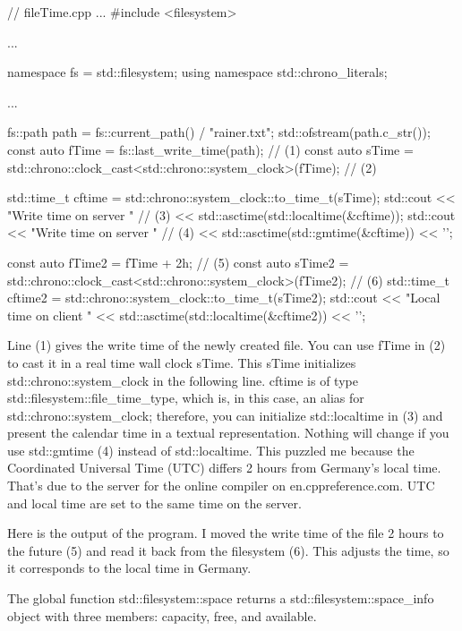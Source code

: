 
\begin{cpp}
// fileTime.cpp
...
#include <filesystem>

...

namespace fs = std::filesystem;
using namespace std::chrono_literals;

...

fs::path path = fs::current_path() / "rainer.txt";
std::ofstream(path.c_str());
const auto fTime = fs::last_write_time(path); // (1)
const auto sTime = std::chrono::clock_cast<std::chrono::system_clock>(fTime); // (2)


std::time_t cftime = std::chrono::system_clock::to_time_t(sTime);
std::cout << "Write time on server " // (3)
		  << std::asctime(std::localtime(&cftime));
std::cout << "Write time on server " // (4)
		  << std::asctime(std::gmtime(&cftime)) << '\n';

const auto fTime2 = fTime + 2h; // (5)
const auto sTime2 = std::chrono::clock_cast<std::chrono::system_clock>(fTime2); // (6)
std::time_t cftime2 = std::chrono::system_clock::to_time_t(sTime2);
std::cout << "Local time on client "
		  << std::asctime(std::localtime(&cftime2)) << '\n';
\end{cpp}

Line (1) gives the write time of the newly created file. You can use fTime in (2) to cast it in a real time wall clock sTime. This sTime initializes std::chrono::system\_clock in the following line. cftime is of type std::filesystem::file\_time\_type, which is, in this case, an alias for std::chrono::system\_clock; therefore, you can initialize std::localtime in (3) and present the calendar time in a textual representation. Nothing will change if you use std::gmtime (4) instead of std::localtime. This puzzled me because the Coordinated Universal Time (UTC) differs 2 hours from Germany’s local time. That’s due to the server for the online compiler on en.cppreference.com. UTC and local time are set to the same time on the server.

Here is the output of the program. I moved the write time of the file 2 hours to the future (5) and read it back from the filesystem (6). This adjusts the time, so it corresponds to the local time in Germany.



The global function std::filesystem::space returns a std::filesystem::space\_info object with three members: capacity, free, and available.

